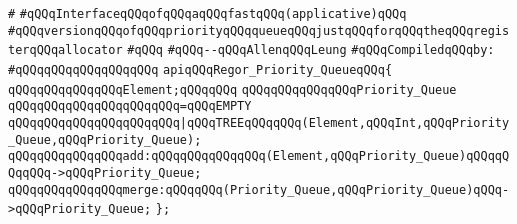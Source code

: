\label{src/lib/compiler/back/low/regor/regor-priority-queue.api}
\verb|#|\newline
\verb|#qQQqInterfaceqQQqofqQQqaqQQqfastqQQq(applicative)qQQq|\newline
\verb|#qQQqversionqQQqofqQQqpriorityqQQqqueueqQQqjustqQQqforqQQqtheqQQqregisterqQQqallocator|\newline
\verb|#qQQq|\newline
\verb|#qQQq--qQQqAllenqQQqLeung|\newline
\newline
\verb|#qQQqCompiledqQQqby:|\newline
\verb|#qQQqqQQqqQQqqQQqqQQq|\newline
\newline
\verb|apiqQQqRegor_Priority_QueueqQQq{|\newline
\newline
\verb|qQQqqQQqqQQqqQQqElement;qQQqqQQq|\newline
\newline
\verb|qQQqqQQqqQQqqQQqPriority_Queue|\newline
\verb|qQQqqQQqqQQqqQQqqQQqqQQq=qQQqEMPTY|\newline
\verb|qQQqqQQqqQQqqQQqqQQqqQQq|\verb#|qQQqTREEqQQqqQQq(Element,qQQqInt,qQQqPriority_Queue,qQQqPriority_Queue);#\newline
\newline
\verb|qQQqqQQqqQQqqQQqadd:qQQqqQQqqQQqqQQq(Element,qQQqPriority_Queue)qQQqqQQqqQQq->qQQqPriority_Queue;|\newline
\verb|qQQqqQQqqQQqqQQqmerge:qQQqqQQq(Priority_Queue,qQQqPriority_Queue)qQQq->qQQqPriority_Queue;|\newline
\verb|};|\newline

